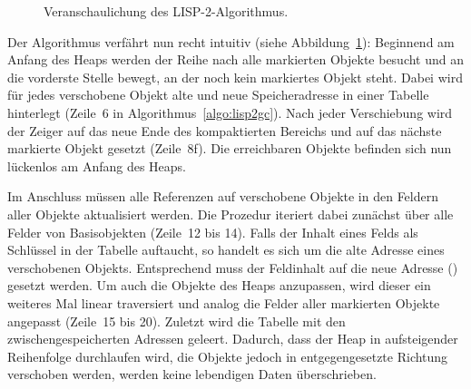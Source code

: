 \begin{figure}[h]
	\centering
	
	\caption[LISP-2-Algorithmus]{Veranschaulichung des LISP-2-Algorithmus.}
	\label{fig:lisp2}
\end{figure}

Der Algorithmus verfährt nun recht intuitiv (siehe Abbildung~\ref{fig:lisp2}):
Beginnend am Anfang des Heaps werden der Reihe nach alle markierten Objekte besucht und an die vorderste Stelle bewegt, an der noch kein markiertes Objekt steht.
Dabei wird für jedes verschobene Objekt alte und neue Speicheradresse in einer Tabelle  hinterlegt (Zeile~6 in Algorithmus~\ref{algo:lisp2gc}).
Nach jeder Verschiebung wird der Zeiger  auf das neue Ende des kompaktierten Bereichs und  auf das nächste markierte Objekt gesetzt (Zeile~8f).
Die erreichbaren Objekte befinden sich nun lückenlos am Anfang des Heaps.

Im Anschluss müssen alle Referenzen auf verschobene Objekte in den Feldern aller Objekte aktualisiert werden.
Die Prozedur  iteriert dabei zunächst über alle Felder von Basisobjekten (Zeile~12 bis 14).
Falls der Inhalt  eines Felds als Schlüssel in der Tabelle auftaucht, so handelt es sich um die alte Adresse eines verschobenen Objekts.
Entsprechend muss der Feldinhalt auf die neue Adresse () gesetzt werden.
Um auch die Objekte des Heaps anzupassen, wird dieser ein weiteres Mal linear traversiert und analog die Felder aller markierten Objekte angepasst (Zeile~15 bis 20).
Zuletzt wird die Tabelle mit den zwischengespeicherten Adressen geleert.
Dadurch, dass der Heap in aufsteigender Reihenfolge durchlaufen wird, die Objekte jedoch in entgegengesetzte Richtung verschoben werden, werden keine lebendigen Daten überschrieben.

